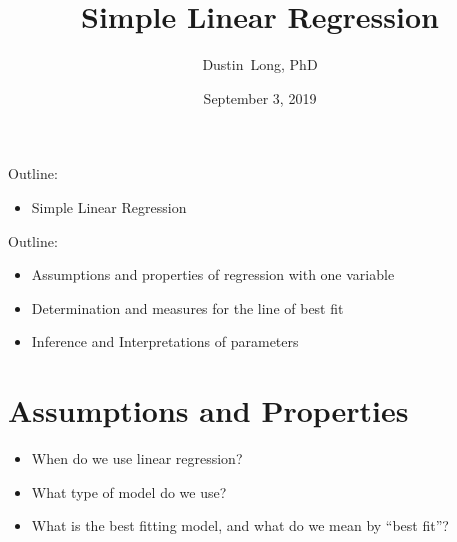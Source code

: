 \documentclass[handout,x11names,unknownkeysallowed]{beamer}
\title[] %
{Simple Linear Regression}
\author[Dustin Long, PhD] %
{Dustin~Long, PhD}
\institute[UAB]
{
  Department of Biostatistics\\
	University of Alabama at Birmingham

}
\date[Week 1]{September 3, 2019}
\makeatletter
\newcommand{\beamitem}{\begin{itemize}[<+-|alert@+>]}
\makeatother
\begin{document}
\begin{frame}
  \titlepage
\end{frame}

\begin{frame}
Outline:
\begin{itemize}
\item Simple Linear Regression
\end{itemize}

\end{frame}


\begin{frame}
Outline:
\begin{itemize}
\item Assumptions and properties of regression with one variable
\item Determination and measures for the line of best fit 
\item Inference and Interpretations of parameters
\end{itemize}

\end{frame}


\section{Assumptions and Properties}
\begin{frame}
\beamitem
\item When do we use linear regression?
\item What type of model do we use?
\item What is the best fitting model, and what do we mean by ``best fit''?
\end{itemize}
\end{frame}
\end{document}
